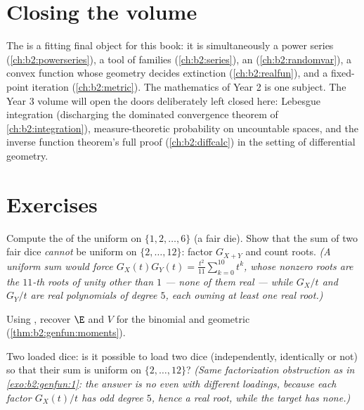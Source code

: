 \section*{Closing the volume}

The  is a fitting final object for this book:
it is simultaneously a power series (\cref{ch:b2:powerseries}), a
tool of  families (\cref{ch:b2:series}), an 
(\cref{ch:b2:randomvar}), a convex function whose geometry decides
extinction (\cref{ch:b2:realfun}), and a fixed-point iteration
(\cref{ch:b2:metric}). The mathematics of Year 2 is one subject.
The Year 3 volume will open the doors deliberately left closed
here: Lebesgue integration (discharging the dominated convergence
theorem of \cref{ch:b2:integration}), measure-theoretic
probability on uncountable spaces, and the inverse function
theorem's full proof (\cref{ch:b2:diffcalc}) in the setting of
differential geometry.

\section{Exercises}

\begin{exercise}[$\star$]\label{exo:b2:genfun:1}
Compute the  of the uniform  on $\{1, 2,
\dots, 6\}$ (a fair die). Show that the sum of two fair dice
\emph{cannot} be uniform on $\{2, \dots, 12\}$: factor $G_{X+Y}$
and count roots. \emph{(A uniform sum would force $G_X(t)G_Y(t) =
\frac{t^2}{11}\sum_{k=0}^{10}t^k$, whose nonzero roots are the
$11$-th roots of unity other than $1$ --- none of them real ---
while $G_X/t$ and $G_Y/t$ are real polynomials of degree $5$, each
owning at least one real root.)}
\end{exercise}

\begin{exercise}[$\star$]\label{exo:b2:genfun:2}
Using , recover $\E$ and $V$ for the binomial
and geometric  (\cref{thm:b2:genfun:moments}).
\end{exercise}

\begin{exercise}[$\star$]\label{exo:b2:genfun:3}
Two loaded dice: is it possible to load two dice (independently,
identically or not) so that their sum is uniform on $\{2, \dots,
12\}$? \emph{(Same factorization obstruction as in
\cref{exo:b2:genfun:1}: the answer is no even with different
loadings, because each factor $G_X(t)/t$ has odd degree $5$,
hence a real root, while the target has none.)}
\end{exercise}


